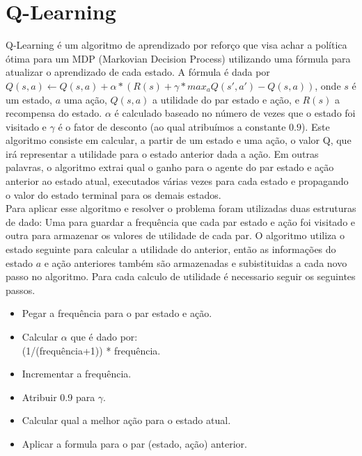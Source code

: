 \documentclass[letterpaper]{article}
\begin{document}
\section{Q-Learning}
Q-Learning é um algoritmo de aprendizado por reforço que visa achar a política ótima para um MDP (Markovian Decision Process) utilizando uma fórmula para atualizar o aprendizado de cada estado. A fórmula é dada por  $Q(s,a) \leftarrow Q(s,a) + \alpha * (R(s) + \gamma *  max_{a} Q(s',a') - Q(s,a)) $, onde $s$ é um estado, $a$ uma ação, $Q(s,a)$ a utilidade do par estado e ação, e $R(s)$ a recompensa do estado. $\alpha$ é calculado baseado no número de vezes que o estado foi visitado e $\gamma$ é o fator de desconto (ao qual atribuímos a constante $0.9$). Este algoritmo consiste em calcular, a partir de um estado e uma ação, o valor Q, que irá representar a utilidade para o estado anterior dada a ação. Em outras palavras, o algoritmo extrai qual o ganho para o agente do par estado e ação anterior ao estado atual, executados várias vezes para cada estado e propagando o valor do estado terminal para os demais estados.  \\ 
Para aplicar esse algoritmo e resolver o problema foram utilizadas duas estruturas de dado: Uma para guardar a frequência que cada par estado e ação foi visitado e outra para armazenar os valores de utilidade de cada par. O algoritmo utiliza o estado seguinte para calcular a utilidade do anterior, então as informações do estado $a$ e ação anteriores também são armazenadas e subistituidas a cada novo passo no algoritmo. Para cada calculo de utilidade é necessario seguir os seguintes passos. 

\begin{itemize}
\item Pegar a frequência para o par estado e ação.
\item Calcular $\alpha$ que é dado por: \\
        (1/(frequência+1)) * frequência.
\item Incrementar a frequência.
\item Atribuir 0.9 para $\gamma$.
\item Calcular qual a melhor ação para o estado atual.
\item Aplicar a formula para o par (estado, ação) anterior.
\end{itemize}
\end{document}
